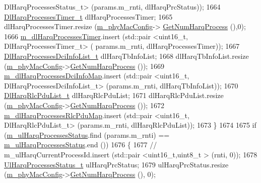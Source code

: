 \begin{DoxyCode}
       DlHarqProcessesStatus\_t> (params.m\_rnti, dlHarqPrcStatus));
1664         \hyperlink{classns3_1_1MmWaveFlexTtiMaxWeightMacScheduler_a386e3c0ef3c5c41fa7d18d32d2f1ff70}{DlHarqProcessesTimer\_t} dlHarqProcessesTimer;
1665         dlHarqProcessesTimer.resize (\hyperlink{classns3_1_1MmWaveMacScheduler_a24d7af4971d2e500fe543cefbafa2fd9}{m\_phyMacConfig}->
      \hyperlink{classns3_1_1MmWavePhyMacCommon_a40773d84172ebeb5aff125f56ebcc5ac}{GetNumHarqProcess} (),0);
1666         \hyperlink{classns3_1_1MmWaveFlexTtiMaxWeightMacScheduler_a60826192a5d859c1a1bb20955b3ad981}{m\_dlHarqProcessesTimer}.insert (std::pair <uint16\_t, DlHarqProcessesTimer\_t> (
      params.m\_rnti, dlHarqProcessesTimer));
1667         \hyperlink{classns3_1_1MmWaveFlexTtiMaxWeightMacScheduler_abe8aaff4b87b3b6639537eb26040a203}{DlHarqProcessesDciInfoList\_t} dlHarqTbInfoList;
1668         dlHarqTbInfoList.resize (\hyperlink{classns3_1_1MmWaveMacScheduler_a24d7af4971d2e500fe543cefbafa2fd9}{m\_phyMacConfig}->\hyperlink{classns3_1_1MmWavePhyMacCommon_a40773d84172ebeb5aff125f56ebcc5ac}{GetNumHarqProcess} ());
1669         \hyperlink{classns3_1_1MmWaveFlexTtiMaxWeightMacScheduler_ac833e86e5419d19a445f1e359d06486e}{m\_dlHarqProcessesDciInfoMap}.insert (std::pair <uint16\_t,
       DlHarqProcessesDciInfoList\_t> (params.m\_rnti, dlHarqTbInfoList));
1670         \hyperlink{classns3_1_1MmWaveFlexTtiMaxWeightMacScheduler_aa4a468c3b36804769d0e97d48d0658b5}{DlHarqRlcPduList\_t} dlHarqRlcPduList;
1671         dlHarqRlcPduList.resize (\hyperlink{classns3_1_1MmWaveMacScheduler_a24d7af4971d2e500fe543cefbafa2fd9}{m\_phyMacConfig}->\hyperlink{classns3_1_1MmWavePhyMacCommon_a40773d84172ebeb5aff125f56ebcc5ac}{GetNumHarqProcess} ());
1672         \hyperlink{classns3_1_1MmWaveFlexTtiMaxWeightMacScheduler_aa9cdf43f057d1bd8e1cfcf2a21ea89f0}{m\_dlHarqProcessesRlcPduMap}.insert (std::pair <uint16\_t,
       DlHarqRlcPduList\_t> (params.m\_rnti, dlHarqRlcPduList));
1673   \}
1674 
1675   \textcolor{keywordflow}{if} (\hyperlink{classns3_1_1MmWaveFlexTtiMaxWeightMacScheduler_aeff65837d6604471dd667bfe89240de2}{m\_ulHarqProcessesStatus}.find (params.m\_rnti) == 
      \hyperlink{classns3_1_1MmWaveFlexTtiMaxWeightMacScheduler_aeff65837d6604471dd667bfe89240de2}{m\_ulHarqProcessesStatus}.end ())
1676   \{
1677         \textcolor{comment}{//                              m\_ulHarqCurrentProcessId.insert (std::pair <uint16\_t,uint8\_t >
       (rnti, 0));}
1678         \hyperlink{classns3_1_1MmWaveFlexTtiMaxWeightMacScheduler_a99865f7f1fd7470360def81114cae540}{UlHarqProcessesStatus\_t} ulHarqPrcStatus;
1679         ulHarqPrcStatus.resize (\hyperlink{classns3_1_1MmWaveMacScheduler_a24d7af4971d2e500fe543cefbafa2fd9}{m\_phyMacConfig}->\hyperlink{classns3_1_1MmWavePhyMacCommon_a40773d84172ebeb5aff125f56ebcc5ac}{GetNumHarqProcess} (), 0);

\end{DoxyCode}
